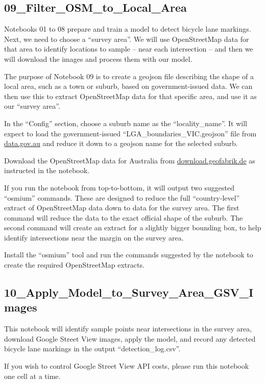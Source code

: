\documentclass[11pt,twoside]{report}
\begin{document}
\subsection{09\_Filter\_OSM\_to\_Local\_Area}
\label{a09}

Notebooks 01 to 08 prepare and train a model to detect bicycle lane markings.  Next, we need to choose a ``survey area''.  We will use OpenStreetMap data for that area to identify locations to sample -- near each intersection -- and then we will download the images and process them with our model.

The purpose of Notebook 09 is to create a geojson file describing the shape of a local area, such as a town or suburb, based on government-issued data.  We can then use this to extract OpenStreetMap data for that specific area, and use it as our ``survey area''.

In the ``Config'' section, choose a suburb name as the ``locality\_name''.  It will expect to load the government-issued ``LGA\_boundaries\_VIC.geojson'' file from \url{data.gov.au} and reduce it down to a geojson name for the selected suburb.

Download the OpenStreetMap data for Australia from \url{download.geofabrik.de} as instructed in the notebook.

If you run the notebook from top-to-bottom, it will output two suggested ``osmium'' commands.  These are designed to reduce the full ``country-level'' extract of OpenStreetMap data down to data for the survey area.  The first command will reduce the data to the exact official shape of the suburb.  The second command will create an extract for a slightly bigger bounding box, to help identify intersections near the margin on the survey area.

Install the ``osmium'' tool and run the commands suggested by the notebook to create the required OpenStreetMap extracts.


\subsection{10\_Apply\_Model\_to\_Survey\_Area\_GSV\_Images}
\label{a10}

This notebook will identify sample points near intersections in the survey area, download Google Street View images, apply the model, and record any detected bicycle lane markings in the output ``detection\_log.csv''.

If you wish to control Google Street View API costs, please run this notebook one cell at a time.
\end{document}
